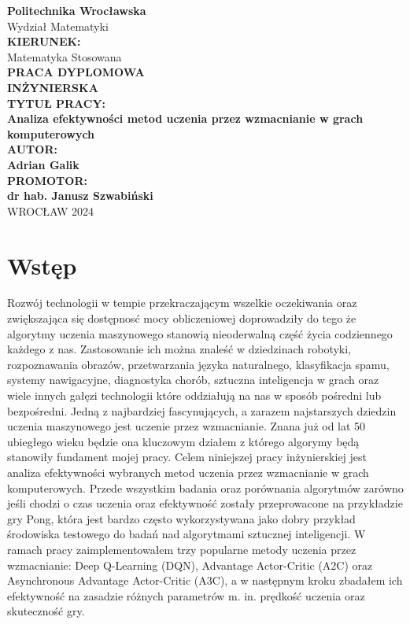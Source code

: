 \documentclass[a4paper, 10pt]{article}
\begin{document}
    \thispagestyle{empty}

    \begin{center}
        \textbf{\LARGE Politechnika Wrocławska} \\[1em]
        \Large Wydział Matematyki \\[2em]

        \textbf{KIERUNEK:} \\
        \Large Matematyka Stosowana \\[2em]

        \textbf{\LARGE PRACA DYPLOMOWA \\[0.5em] INŻYNIERSKA} \\[6em]

        \textbf{\large TYTUŁ PRACY:} \\[1em]
        \textbf{\Large Analiza efektywności metod uczenia przez wzmacnianie w grach komputerowych} \\[2em]

        \textbf{\large AUTOR:} \\[1em]
        \textbf{\Large Adrian Galik} \\[2em]

        \textbf{\large PROMOTOR:} \\[1em]
        \textbf{\Large dr hab. Janusz Szwabiński } \\[10em]

        WROCŁAW 2024
    \end{center}

    \newpage
    \section{Wstęp}
    \indent Rozwój technologii w tempie przekraczającym wszelkie oczekiwania oraz zwiększająca się dostępnosć mocy
    obliczeniowej doprowadziły do tego że algorytmy uczenia maszynowego stanowią nieoderwalną część życia codziennego
    każdego z nas. Zastosowanie ich można znaleść w dziedzinach robotyki, rozpoznawania obrazów, przetwarzania
    języka naturalnego, klasyfikacja spamu, systemy nawigacyjne, diagnostyka chorób, sztuczna inteligencja w grach oraz
    wiele innych gałęzi technologii które oddziałują na nas w sposób pośredni lub bezpośredni. Jedną z najbardziej 
    fascynujących, a zarazem najstarszych dziedzin uczenia maszynowego jest uczenie przez wzmacnianie. Znana już od lat 50 ubiegłego wieku
    będzie ona kluczowym działem z którego algorymy będą stanowiły fundament mojej pracy.
    \newline
    \indent Celem niniejszej pracy inżynierskiej jest analiza efektywności wybranych metod uczenia
    przez wzmacnianie w grach komputerowych. Przede wszystkim badania oraz porównania algorytmów zarówno jeśli chodzi o czas uczenia
    oraz efektywność zostały przeprowacone na przykładzie gry Pong, która jest bardzo często wykorzystywana jako dobry przykład środowiska testowego
    do badań nad algorytmami sztucznej inteligencji. W ramach pracy zaimplementowałem trzy popularne metody uczenia przez wzmacnianie:
    Deep Q-Learning (DQN), Advantage Actor-Critic (A2C) oraz Asynchronous Advantage Actor-Critic (A3C), a w następnym kroku zbadałem ich efektywność
    na zasadzie różnych parametrów m. in. prędkość uczenia oraz skuteczność gry.
\end{document}
